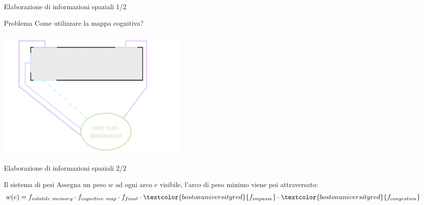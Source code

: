 \documentclass{beamer}
\begin{document}
{}

\begin{frame}{Elaborazione di informazioni spaziali 1/2}
\begin{alertblock}{Problema}
Come utilizzare la mappa cognitiva?
\end{alertblock}{}
\hfil\hfil\includegraphics[width=9.5cm]{figures/polygonal-chains-to-subdestination.png}
\end{frame}

\begin{frame}{Elaborazione di informazioni spaziali 2/2}
\begin{block}{Il sistema di pesi}
Assegna un peso \(w\) ad ogni arco \(e\) visibile, l'arco di peso minimo viene poi attraversato:
\begin{equation}
    w(e) = f_{volatile\ memory}\cdot f_{cognitive\ map}\cdot f_{final}\cdot \textcolor{bostonuniversityred}{f_{impasse}}\cdot \textcolor{bostonuniversityred}{f_{congestion}}
\end{equation}{}
\end{block}
\end{frame}
\end{document}
